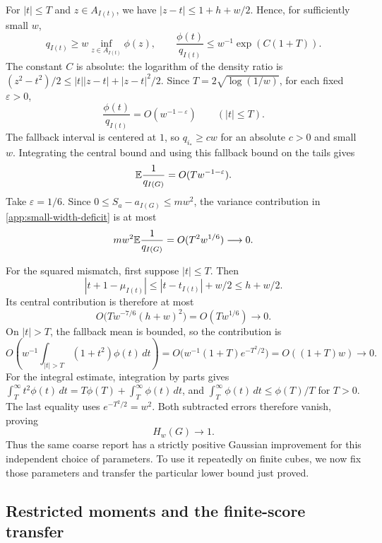 For $|t|\le T$ and $z\in A_{I(t)}$, we have
$|z-t|\le1+h+w/2$.  Hence, for sufficiently small $w$,
\[
 q_{I(t)}\ge w\inf_{z\in A_{I(t)}}\phi(z),\qquad
 \frac{\phi(t)}{q_{I(t)}}
 \le w^{-1}\exp(C(1+T)).
\]
The constant $C$ is absolute: the logarithm of the density ratio is
$(z^2-t^2)/2\le |t||z-t|+|z-t|^2/2$.
Since $T=2\sqrt{\log(1/w)}$, for each fixed $\varepsilon>0$,
\begin{equation}\label{app:small-width-inverse-density}
 \frac{\phi(t)}{q_{I(t)}}=O(w^{-1-\varepsilon})
 \qquad (|t|\le T).
\end{equation}
The fallback interval is centered at $1$, so $q_{i_*}\ge cw$ for
an absolute $c>0$ and small $w$.  Integrating the central bound and
using this fallback bound on the tails gives
\begin{equation}\label{app:small-width-inverse-mean}
 \mathbb E\frac1{q_{I(G)}}=O(Tw^{-1-\varepsilon}).
\end{equation}
Take $\varepsilon=1/6$. Since $0\le S_a-a_{I(G)}\le mw^2$,
the variance contribution in
\eqref{app:small-width-deficit} is at most
\[
 mw^2\mathbb E\frac1{q_{I(G)}}
 =O(T^2w^{1/6})\longrightarrow0.
\]

For the squared mismatch, first suppose $|t|\le T$. Then
\[
 |t+1-\mu_{I(t)}|
 \le |t-t_{I(t)}|+w/2\le h+w/2.
\]
Its central contribution is therefore at most
\[
 O\bigl(Tw^{-7/6}(h+w)^2\bigr)
 =O(Tw^{1/6})\longrightarrow0.
\]
On $|t|>T$, the fallback mean is bounded, so the contribution is
\[
 O\left(w^{-1}\int_{|t|>T}(1+t^2)\phi(t)\,dt\right)
 =O\bigl(w^{-1}(1+T)e^{-T^2/2}\bigr)
 =O((1+T)w)\longrightarrow0.
\]
For the integral estimate, integration by parts gives
$\int_T^\infty t^2\phi(t)\,dt
=T\phi(T)+\int_T^\infty\phi(t)\,dt$, and
$\int_T^\infty\phi(t)\,dt\le\phi(T)/T$ for $T>0$.
The last equality uses $e^{-T^2/2}=w^2$.
Both subtracted errors therefore vanish, proving
\begin{equation}\label{app:small-width-limit}
 H_w(G)\longrightarrow1.
\end{equation}
Thus the same coarse report has a strictly positive Gaussian
improvement for this independent choice of parameters.  To use it
repeatedly on finite cubes, we now fix those parameters and transfer
the particular lower bound just proved.

\subsection{Restricted moments and the finite-score transfer}
\label{app:small-width-transfer}

